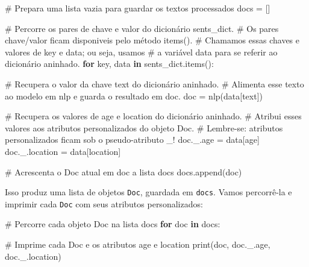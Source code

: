 \documentclass[
  brazilian,
  11pt,
]{article}
\newenvironment{Shaded}{\begin{snugshade}}{\end{snugshade}}
\newcommand{\BuiltInTok}[1]{\textcolor[rgb]{0.50,0.55,0.55}{#1}}
\newcommand{\CommentTok}[1]{\textcolor[rgb]{0.48,0.49,0.49}{#1}}
\newcommand{\ControlFlowTok}[1]{\textcolor[rgb]{0.99,0.74,0.29}{\textbf{#1}}}
\newcommand{\KeywordTok}[1]{\textcolor[rgb]{0.81,0.81,0.76}{\textbf{#1}}}
\newcommand{\NormalTok}[1]{\textcolor[rgb]{0.81,0.81,0.76}{#1}}
\newcommand{\OperatorTok}[1]{\textcolor[rgb]{0.81,0.81,0.76}{#1}}
\newcommand{\StringTok}[1]{\textcolor[rgb]{0.96,0.31,0.31}{#1}}
\let\oldtexttt\texttt
\renewcommand{\texttt}[1]{{\color{inlink}\oldtexttt{#1}}}
\begin{document}
\begin{Shaded}
\begin{Highlighting}[]
\CommentTok{\# Prepara uma lista vazia para guardar os textos processados}
\NormalTok{docs }\OperatorTok{=}\NormalTok{ []}

\CommentTok{\# Percorre os pares de chave e valor do dicionário \textquotesingle{}sents\_dict\textquotesingle{}.}
\CommentTok{\# Os pares chave/valor ficam disponiveis pelo método items().}
\CommentTok{\# Chamamos essas chaves e valores de \textquotesingle{}key\textquotesingle{} e \textquotesingle{}data\textquotesingle{}; ou seja, usamos}
\CommentTok{\# a variável \textquotesingle{}data\textquotesingle{} para se referir ao dicionário aninhado.}
\ControlFlowTok{for}\NormalTok{ key, data }\KeywordTok{in}\NormalTok{ sents\_dict.items():}

    \CommentTok{\# Recupera o valor da chave \textquotesingle{}text\textquotesingle{} do dicionário aninhado.}
    \CommentTok{\# Alimenta esse texto ao modelo em \textquotesingle{}nlp\textquotesingle{} e guarda o resultado em \textquotesingle{}doc\textquotesingle{}.}
\NormalTok{    doc }\OperatorTok{=}\NormalTok{ nlp(data[}\StringTok{\textquotesingle{}text\textquotesingle{}}\NormalTok{])}

    \CommentTok{\# Recupera os valores de \textquotesingle{}age\textquotesingle{} e \textquotesingle{}location\textquotesingle{} do dicionário aninhado.}
    \CommentTok{\# Atribui esses valores aos atributos personalizados do objeto Doc.}
    \CommentTok{\# Lembre{-}se: atributos personalizados ficam sob o pseudo{-}atributo \textquotesingle{}\_\textquotesingle{}!}
\NormalTok{    doc.\_.age }\OperatorTok{=}\NormalTok{ data[}\StringTok{\textquotesingle{}age\textquotesingle{}}\NormalTok{]}
\NormalTok{    doc.\_.location }\OperatorTok{=}\NormalTok{ data[}\StringTok{\textquotesingle{}location\textquotesingle{}}\NormalTok{]}

    \CommentTok{\# Acrescenta o Doc atual em \textquotesingle{}doc\textquotesingle{} a lista \textquotesingle{}docs\textquotesingle{}}
\NormalTok{    docs.append(doc)}
\end{Highlighting}
\end{Shaded}

Isso produz uma lista de objetos \texttt{Doc}, guardada em
\texttt{docs}. Vamos percorrê‑la e imprimir cada \texttt{Doc} com seus
atributos personalizados:

\begin{Shaded}
\begin{Highlighting}[]
\CommentTok{\# Percorre cada objeto Doc na lista \textquotesingle{}docs\textquotesingle{}}
\ControlFlowTok{for}\NormalTok{ doc }\KeywordTok{in}\NormalTok{ docs:}

    \CommentTok{\# Imprime cada Doc e os atributos \textquotesingle{}age\textquotesingle{} e \textquotesingle{}location\textquotesingle{}}
    \BuiltInTok{print}\NormalTok{(doc, doc.\_.age, doc.\_.location)}
\end{Highlighting}
\end{Shaded}
\end{document}
